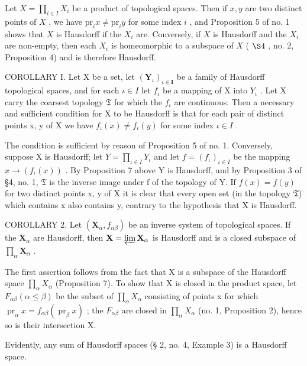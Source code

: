 Let \(X = \prod_{i \in I} X_i\) be a product of topological spaces. Then if \(x, y\) are two distinct points of \(X\) , we have \(\text{pr}_i x \neq \text{pr}_i y\) for some index \(i\) , and Proposition 5 of no. 1 shows that \(X\) is Hausdorff if the \(X_i\) are. Conversely, if \(X\) is Hausdorff and the \(X_i\) are non-empty, then each \(X_i\) is homeomorphic to a subspace of \(X\) ( \(\S 4\) , no. 2, Proposition 4) and is therefore Hausdorff.

COROLLARY I. Let X be a set, let \((\mathbf{Y}_{\iota})_{\iota \in \mathbf{I}}\) be a family of Hausdorff topological spaces, and for each \(\iota \in I\) let \(f_{\iota}\) be a mapping of X into \(Y_{\iota}\) . Let X carry the coarsest topology \(\mathfrak{T}\) for which the \(f_{\iota}\) are continuous. Then a necessary and sufficient condition for X to be Hausdorff is that for each pair of distinct points x, y of X we have \(f_{\iota}(x) \neq f_{\iota}(y)\) for some index \(\iota \in I\) .

The condition is sufficient by reason of Proposition 5 of no. 1. Conversely, suppose X is Hausdorff; let \(Y = \prod_{\iota \in I} Y_{\iota}\) and let \(f = (f_{\iota})_{\iota \in I}\) be the mapping \(x \to (f_{\iota}(x))\) . By Proposition 7 above Y is Hausdorff, and by Proposition 3 of §4, no. 1, \(\mathfrak{T}\) is the inverse image under f of the topology of Y. If \(f(x) = f(y)\) for two distinct points x, y of X it is clear that every open set (in the topology \(\mathfrak{T}\)) which contains x also contains y, contrary to the hypothesis that X is Hausdorff.

COROLLARY 2. Let \((\mathbf{X}_{\alpha}, f_{\alpha \beta})\) be an inverse system of topological spaces. If the \(\mathbf{X}_{\alpha}\) are Hausdorff, then \(\mathbf{X} = \varprojlim \mathbf{X}_{\alpha}\) is Hausdorff and is a closed subspace of \(\prod_{\alpha} \mathbf{X}_{\alpha}\) .

The first assertion follows from the fact that X is a subspace of the Hausdorff space \(\prod_{\alpha} X_{\alpha}\) (Proposition 7). To show that X is closed in the product space, let \(F_{\alpha\beta} (\alpha \leqslant \beta)\) be the subset of \(\prod_{\alpha} X_{\alpha}\) consisting of points x for which \(\operatorname{pr}_{\alpha}x = f_{\alpha\beta}(\operatorname{pr}_{\beta}x)\) ; the \(F_{\alpha\beta}\) are closed in \(\prod_{\alpha} X_{\alpha}\) (no. 1, Proposition 2), hence so is their intersection X.

Evidently, any sum of Hausdorff spaces (§ 2, no. 4, Example 3) is a Hausdorff space.

